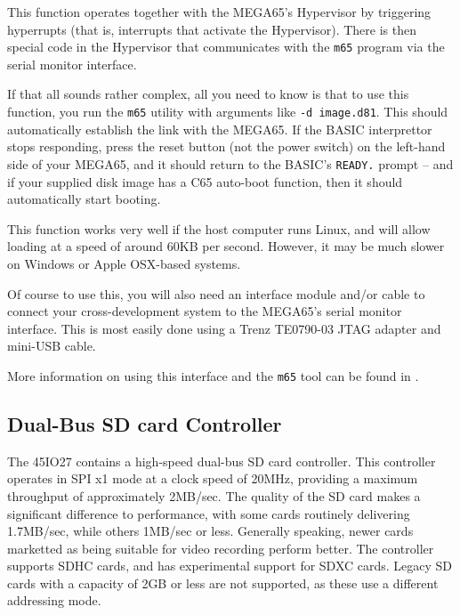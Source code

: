 This function operates together with the MEGA65's Hypervisor by
triggering hyperrupts (that is, interrupts that activate the
Hypervisor).  There is then special code in the Hypervisor that
communicates with the {\tt m65} program via the serial monitor
interface.

If that all sounds rather complex, all you need to know is that to use
this function, you run the {\tt m65} utility with arguments like
{\tt -d image.d81}.  This should automatically establish the link with
the MEGA65.  If the BASIC interprettor stops responding, press the
reset button (not the power switch) on the left-hand side of your MEGA65,
and it should return to the BASIC's {\tt READY.} prompt -- and if your
supplied disk image has a C65 auto-boot function, then it should
automatically start booting.

This function works very well if the host computer runs Linux, and
will allow loading at a speed of around 60KB per second.  However, it
may be much slower on Windows or Apple OSX-based systems.

Of course to use this, you will also need an interface module and/or
cable to connect your cross-development system to the MEGA65's serial
monitor interface. This is most easily done using a Trenz TE0790-03
JTAG adapter and mini-USB cable.

More information on using this interface and the {\tt m65} tool can be
found in .

\subsection{Dual-Bus SD card Controller}

The 45IO27 contains a high-speed dual-bus SD card controller.  This
controller operates in SPI x1 mode at a clock speed of 20MHz,
providing a maximum throughput of approximately 2MB/sec.  The quality
of the SD card makes a significant difference to performance, with some
cards routinely delivering 1.7MB/sec, while others 1MB/sec or
less. Generally speaking, newer cards marketted as being suitable for
video recording perform better.  The controller supports SDHC cards,
and has experimental support for SDXC cards.  Legacy SD cards with a
capacity of 2GB or less are not supported, as these use a different
addressing mode.

